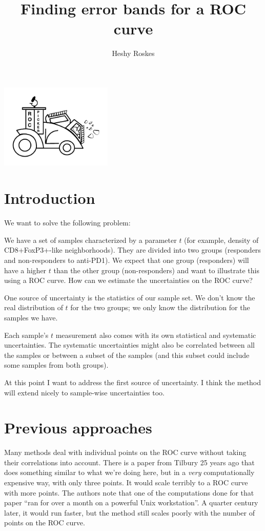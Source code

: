 \documentclass[11pt]{article}
\title{Finding error bands for a ROC curve}
\author{Heshy Roskes}
\date{}
\begin{document}
\maketitle

\begin{center}
\includegraphics[width=0.4\textwidth]{logo.png}
\end{center}

\section{Introduction}

We want to solve the following problem:

We have a set of samples characterized by a parameter \(t\) (for example, density of CD8+FoxP3+-like neighborhoods).  They are divided into two groups (responders and non-responders to anti-PD1).  We expect that one group (responders) will have a higher \(t\) than the other group (non-responders) and want to illustrate this using a ROC curve.  How can we estimate the uncertainties on the ROC curve?

One source of uncertainty is the statistics of our sample set.  We don't know the real distribution of \(t\) for the two groups; we only know the distribution for the samples we have.

Each sample's \(t\) measurement also comes with its own statistical and systematic uncertainties.  The systematic uncertainties might also be correlated between all the samples or between a subset of the samples (and this subset could include some samples from both groups).

At this point I want to address the first source of uncertainty.  I think the method will extend nicely to sample-wise uncertainties too.

\section{Previous approaches}

Many methods \autocite{roc_kerekes} deal with individual points on the ROC curve without taking their correlations into account.  There is a paper from Tilbury 25 years ago \autocite{roc_tilbury} that does something similar to what we're doing here, but in a \emph{very} computationally expensive way, with only three points.  It would scale terribly to a ROC curve with more points.  The authors note that one of the computations done for that paper ``ran for over a month on a powerful Unix workstation''.  A quarter century later, it would run faster, but the method still scales poorly with the number of points on the ROC curve.
\end{document}
